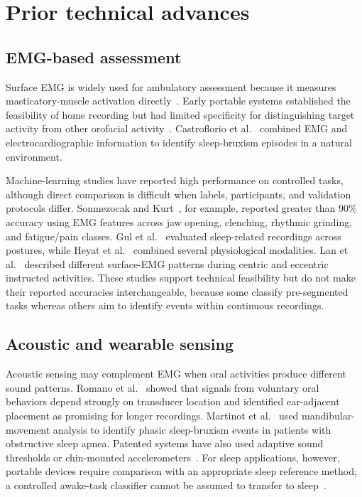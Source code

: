 \documentclass[pdflatex,sn-nature,iicol]{sn-jnl}
\begin{document}
\section{Prior technical advances}

\subsection{EMG-based assessment}

Surface EMG is widely used for ambulatory assessment because it measures masticatory-muscle activation directly~\cite{raez2006techniques}. Early portable systems established the feasibility of home recording but had limited specificity for distinguishing target activity from other orofacial activity~\cite{stuginski2016detection}. Castroflorio et al.~\cite{castroflorio2013use} combined EMG and electrocardiographic information to identify sleep-bruxism episodes in a natural environment.

Machine-learning studies have reported high performance on controlled tasks, although direct comparison is difficult when labels, participants, and validation protocols differ. Sonmezocak and Kurt~\cite{sonmezocak2021detection}, for example, reported greater than 90\% accuracy using EMG features across jaw opening, clenching, rhythmic grinding, and fatigue/pain classes. Gul et al.~\cite{gul2024advanced} evaluated sleep-related recordings across postures, while Heyat et al.~\cite{heyat2020computational} combined several physiological modalities. Lan et al.~\cite{lan2022comparative} described different surface-EMG patterns during centric and eccentric instructed activities. These studies support technical feasibility but do not make their reported accuracies interchangeable, because some classify pre-segmented tasks whereas others aim to identify events within continuous recordings.

\subsection{Acoustic and wearable sensing}

Acoustic sensing may complement EMG when oral activities produce different sound patterns. Romano et al.~\cite{romano2024wearable} showed that signals from voluntary oral behaviors depend strongly on transducer location and identified ear-adjacent placement as promising for longer recordings. Martinot et al.~\cite{martinot2021artificial} used mandibular-movement analysis to identify phasic sleep-bruxism events in patients with obstructive sleep apnea. Patented systems have also used adaptive sound thresholds or chin-mounted accelerometers~\cite{haugland2020automatic,patwa2017bruxism}. For sleep applications, however, portable devices require comparison with an appropriate sleep reference method; a controlled awake-task classifier cannot be assumed to transfer to sleep~\cite{cidverdejo2024instrumental}.
\end{document}
